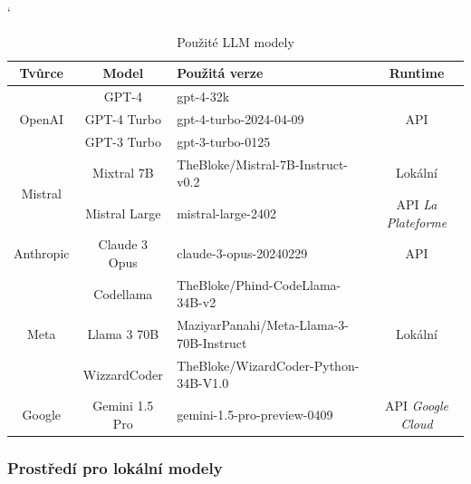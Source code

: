 \documentclass[czech, ma, kiv, he, iso690numb, pdf, viewonly]{fasthesis}
\begin{document}
            \begin{table}
                \catcode`
                \begin{tabular}{|c|c|p{5cm}|c|}
                    \hline
                    \textbf{Tvůrce} & \textbf{Model} & \textbf{Použitá verze} & \textbf{Runtime} \\
                    \hline
                    \multirow{3}{*}{OpenAI} & GPT-4 & gpt-4-32k & \multirow{3}{*}{API} \\
                    \cline{2-3} 
                    & GPT-4 Turbo & gpt-4-turbo-2024-04-09 &  \\
                    \cline{2-3} 
                    & GPT-3 Turbo & gpt-3-turbo-0125 &  \\
                    \hline
                    \multirow{2}{*}{Mistral} & Mixtral 7B & TheBloke/Mistral-7B-Instruct-v0.2 & Lokální \\
                    \cline{2-4} 
                     & Mistral Large & mistral-large-2402 & API \textit{La Plateforme} \\
                    \hline
                    Anthropic & Claude 3 Opus & claude-3-opus-20240229 & API \\
                    \hline
                    \multirow{3}{*}{Meta} & Codellama & TheBloke/Phind-CodeLlama-34B-v2 & \multirow{3}{*}{Lokální} \\
                    \cline{2-3}
                     & Llama 3 70B & MaziyarPanahi/Meta-Llama-3-70B-Instruct & \\
                    \cline{2-3}
                     & WizzardCoder & TheBloke/WizardCoder-Python-34B-V1.0 & \\
                    \hline
                    Google & Gemini 1.5 Pro & gemini-1.5-pro-preview-0409 & API \textit{Google Cloud} \\
                    \hline
                \end{tabular}
                \centering
                \caption{Použité LLM modely}
                \label{tab:used_models}
            \end{table}

            \subsubsection{Prostředí pro lokální modely} \label{sec:local_env}
\end{document}
